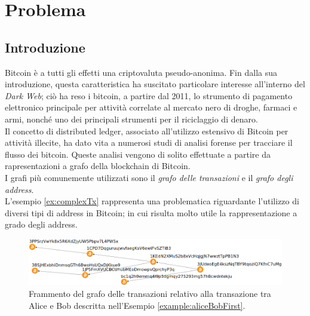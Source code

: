 \chapter{Problema}\label{chap:problema}

\section{Introduzione} \label{sec:problemaIntroduzione}

Bitcoin è a tutti gli effetti una criptovaluta pseudo-anonima. Fin dalla sua introduzione, questa  caratteristica  ha suscitato particolare interesse all’interno del \emph{Dark Web}; ciò ha reso i bitcoin, a partire dal 2011,  lo strumento di pagamento elettronico principale per attività correlate al mercato nero di droghe, farmaci e armi, nonché uno dei principali strumenti per il riciclaggio di denaro.\\
Il concetto di distributed ledger, associato all’utilizzo estensivo di Bitcoin per attività illecite, ha dato vita a numerosi studi di analisi forense per tracciare il flusso dei bitcoin. Queste analisi vengono di solito effettuate a partire da rapresentazioni a grafo della blockchain di Bitcoin.\\
I grafi più comunemente utilizzati sono il \emph{grafo delle transazioni} e il \emph{grafo degli address}.\\
L'esempio \ref{ex:complexTx} rappresenta una problematica riguardante l'utilizzo di diversi tipi di address in Bitcoin; in cui risulta molto utile la rappresentazione a grado degli address.
\begin{figure}
\centering
\includegraphics[scale=0.35]{images/exampleWithGraph/complex-tx.png}
\caption{Frammento del grafo delle transazioni relativo alla  transazione tra Alice e Bob descritta nell’Esempio \ref{example:aliceBobFirst}.\label{fig:complexTx}}
\end{figure}


